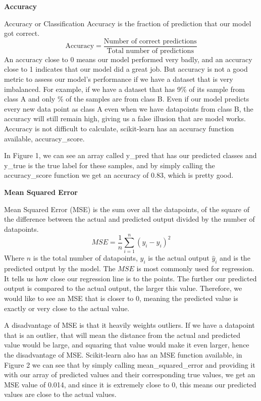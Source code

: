 \documentclass[a4paper,12pt]{report}
\newcommand{\msection}[1]{\noindent\textbf{#1}}
\begin{document}
\msection{Accuracy}

Accuracy or Classification Accuracy is the fraction of prediction that our model got correct.
$$\text{Accuracy}=\frac{\text{Number of correct predictions}}{\text{Total number of predictions}}$$
An accuracy close to 0 means our model performed very badly, and an accuracy close to 1 indicates that our model did a great job. But accuracy is not a good metric to assess our model’s performance if we have a dataset that is very imbalanced. For example, if we have a dataset that has 9\% of its sample from class A and only \% of the samples are from class B. Even if our model predicts every new data point as class A even when we have datapoints from class B, the accuracy will still remain high, giving us a false illusion that are model works. Accuracy is not difficult to calculate, scikit-learn has an accuracy function available, accuracy\_score.


In Figure 1, we can see an array called y\_pred that has our predicted classes and y\_true is the true label for these samples, and by simply calling the accuracy\_score function we get an accuracy of 0.83, which is pretty good.

\msection{Mean Squared Error}

Mean Squared Error (MSE) is the sum over all the datapoints, of the square of the difference between the actual and predicted output divided by the number of datapoints.
$$MSE=\frac{1}{n}\sum_{i=1}^n(y_i-\hat{y}_i)^2$$
Where $n$ is the total number of datapoints, $y_i$ is the actual output $\hat{y}_i$ and  is the predicted output by the model. The $MSE$ is most commonly used for regression. It tells us how close our regression line is to the points. The further our predicted output is compared to the actual output, the larger this value. Therefore, we would like to see an MSE that is closer to 0, meaning the predicted value is exactly or very close to the actual value.

A disadvantage of MSE is that it heavily weights outliers. If we have a datapoint that is an outlier, that will mean the distance from the actual and predicted value would be large, and squaring that value would make it even larger, hence the disadvantage of MSE. Scikit-learn also has an MSE function available, in Figure 2 we can see that by simply calling mean\_squared\_error and providing it with our array of predicted values and their corresponding true values, we get an MSE value of 0.014, and since it is extremely close to 0, this means our predicted values are close to the actual values.
\end{document}
